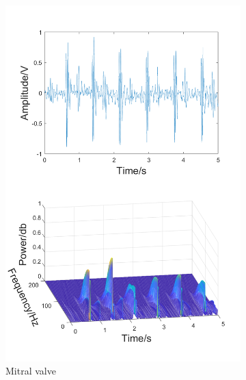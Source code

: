 \begin{figure}[h]
\centering
    \begin{subfigure}{.3\linewidth}
        \centering
        \includegraphics[width=1\linewidth]{figs/disscussion/a.png}
        \caption{Mitral valve}
        \label{FIG:Time&Frequency.a}
    \end{subfigure}\hfill
    \begin{subfigure}{.3\linewidth}
        \centering

\end{subfigure}
\end{figure}
